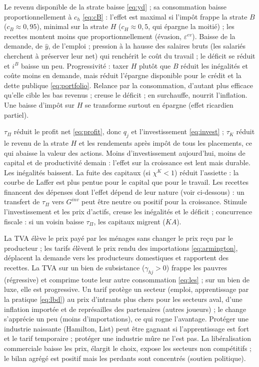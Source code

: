 \documentclass[11pt,a4paper]{article}
\begin{document}
\direct Le revenu disponible de la strate baisse \eqref{eq:yd} ; sa consommation baisse proportionnellement à $c_h$ \eqref{eq:cB} : l'effet est maximal si l'impôt frappe la strate $B$ ($c_B\approx0{,}95$), minimal sur la strate $H$ ($c_H\approx0{,}5$, qui épargne la moitié) ; les recettes montent moins que proportionnellement (évasion, $\varepsilon^{ev}$).
\second Baisse de la demande, de $\hat y$, de l'emploi ; pression à la hausse des salaires bruts (les salariés cherchent à préserver leur net) qui renchérit le coût du travail ; le déficit se réduit et $i^B$ baisse un peu. Progressivité : taxer $H$ plutôt que $B$ réduit les inégalités et coûte moins en demande, mais réduit l'épargne disponible pour le crédit et la dette publique \eqref{eq:portfolio}.
\baisse Relance par la consommation, d'autant plus efficace qu'elle cible les bas revenus ; creuse le déficit ; en surchauffe, nourrit l'inflation. Une baisse d'impôt sur $H$ se transforme surtout en épargne (effet ricardien partiel).

\direct $\tau_\Pi$ réduit le profit net \eqref{eq:profit}, donc $q_j$ et l'investissement \eqref{eq:invest} ; $\tau_K$ réduit le revenu de la strate $H$ et les rendements après impôt de tous les placements, ce qui abaisse la valeur des actions.
\second Moins d'investissement aujourd'hui, moins de capital et de productivité demain : l'effet sur la croissance est lent mais durable. Les inégalités baissent. La fuite des capitaux (si $\chi^K<1$) réduit l'assiette : la courbe de Laffer est plus pentue pour le capital que pour le travail. Les recettes financent des dépenses dont l'effet dépend de leur nature (voir ci-dessous) : un transfert de $\tau_\Pi$ vers $G^{inv}$ peut être neutre ou positif pour la croissance.
\baisse Stimule l'investissement et les prix d'actifs, creuse les inégalités et le déficit ; concurrence fiscale : si un voisin baisse $\tau_\Pi$, les capitaux migrent ($KA$).

\direct La TVA élève le prix payé par les ménages sans changer le prix reçu par le producteur ; les tarifs élèvent le prix rendu des importations \eqref{eq:armington}, déplacent la demande vers les producteurs domestiques et rapportent des recettes.
\second La TVA sur un bien de subsistance ($\gamma_{hj}>0$) frappe les pauvres (régressive) et comprime toute leur autre consommation \eqref{eq:les} ; sur un bien de luxe, elle est progressive. Un tarif protège un secteur (emploi, apprentissage par la pratique \eqref{eq:lbd}) au prix d'intrants plus chers pour les secteurs aval, d'une inflation importée et de représailles des partenaires (autres joueurs) ; le change s'apprécie un peu (moins d'importations), ce qui rogne l'avantage. Protéger une industrie naissante (Hamilton, List) peut être gagnant si l'apprentissage est fort et le tarif temporaire ; protéger une industrie mûre ne l'est pas.
\baisse La libéralisation commerciale baisse les prix, élargit le choix, expose les secteurs non compétitifs ; le bilan agrégé est positif mais les perdants sont concentrés (soutien politique).
\end{document}
